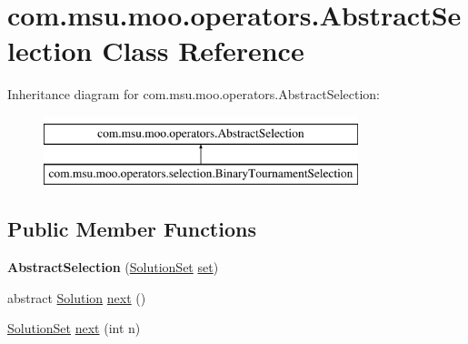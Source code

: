 \hypertarget{classcom_1_1msu_1_1moo_1_1operators_1_1AbstractSelection}{\section{com.\-msu.\-moo.\-operators.\-Abstract\-Selection Class Reference}
\label{classcom_1_1msu_1_1moo_1_1operators_1_1AbstractSelection}
}
Inheritance diagram for com.\-msu.\-moo.\-operators.\-Abstract\-Selection\-:\begin{figure}[H]
\begin{center}
\leavevmode
\includegraphics[height=2.000000cm]{classcom_1_1msu_1_1moo_1_1operators_1_1AbstractSelection}
\end{center}
\end{figure}
\subsection*{Public Member Functions}
\begin{DoxyCompactItemize}
\item 
\hypertarget{classcom_1_1msu_1_1moo_1_1operators_1_1AbstractSelection_aad5346960ec2e9d8c7d1b5068ed2ea49}{{\bfseries Abstract\-Selection} (\hyperlink{classcom_1_1msu_1_1moo_1_1model_1_1solution_1_1SolutionSet}{Solution\-Set} \hyperlink{classcom_1_1msu_1_1moo_1_1operators_1_1AbstractSelection_ade84bd57f9d26c9d9b2e90bb6591b79c}{set})}\label{classcom_1_1msu_1_1moo_1_1operators_1_1AbstractSelection_aad5346960ec2e9d8c7d1b5068ed2ea49}

\item 
abstract \hyperlink{classcom_1_1msu_1_1moo_1_1model_1_1solution_1_1Solution}{Solution} \hyperlink{classcom_1_1msu_1_1moo_1_1operators_1_1AbstractSelection_aa76e453252464eaca1d9337a41e4ade0}{next} ()
\item 
\hyperlink{classcom_1_1msu_1_1moo_1_1model_1_1solution_1_1SolutionSet}{Solution\-Set} \hyperlink{classcom_1_1msu_1_1moo_1_1operators_1_1AbstractSelection_a5b460b6d8320e9dd02fa8f12bd2e1e75}{next} (int n)
\end{DoxyCompactItemize}
